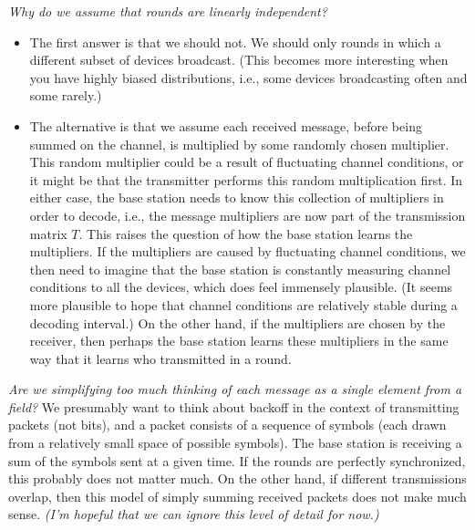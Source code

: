 \emph{Why do we assume that rounds are linearly independent?}
\begin{itemize}
\item The first answer is that we should not.  We should only rounds in which a different subset of devices broadcast.  (This becomes more interesting when you have highly biased distributions, i.e., some devices broadcasting often and some rarely.)

\item The alternative is that we assume each received message, before being summed on the channel, is multiplied by some randomly chosen multiplier.  This random multiplier could be a result of fluctuating channel conditions, or it might be that the transmitter performs this random multiplication first.  In either case, the base station needs to know this collection of multipliers in order to decode, i.e., the message multipliers are now part of the transmission matrix $T$.  This raises the question of how the base station learns the multipliers.  If the multipliers are caused by fluctuating channel conditions, we then need to imagine that the base station is constantly measuring channel conditions to all the devices, which does feel immensely plausible.  (It seems more plausible to hope that channel conditions are relatively stable during a decoding interval.)  On the other hand, if the multipliers are chosen by the receiver, then perhaps the base station learns these multipliers in the same way that it learns who transmitted in a round. 
\end{itemize}

\emph{Are we simplifying too much thinking of each message as a single element from a field?}  We presumably want to think about backoff in the context of transmitting packets (not bits), and a packet consists of a sequence of symbols (each drawn from a relatively small space of possible symbols).  The base station is receiving a sum of the symbols sent at a given time.  If the rounds are perfectly synchronized, this probably does not matter much.  On the other hand, if different transmissions overlap, then this model of simply summing received packets does not make much sense.  \emph{(I'm hopeful that we can ignore this level of detail for now.)}